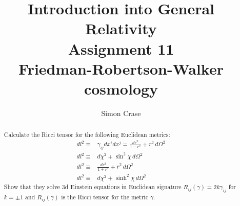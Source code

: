 \documentclass[]{article}
\title{Introduction into General Relativity\\Assignment 11\\Friedman-Robertson-Walker cosmology}
\author{Simon Crase}
\begin{document}
\maketitle

\begin{abstract}
Calculate the Ricci tensor for the following Euclidean metrics:
\begin{align*}
dl^2\equiv&\gamma_{ij}dx^idx^j=\frac{dr^2}{1-r^2}+r^2\,d\Omega^2\\
dl^2\equiv&d\chi^2+\sin^2 \chi\,d\Omega^2\\
dl^2\equiv&\frac{dr^2}{1+r^2}+r^2\,d\Omega^2\\
dl^2\equiv&d\chi^2+\sinh^2 \chi\,d\Omega^2
\end{align*}
Show that they solve 3d Einstein equations in Euclidean signature $R_{ij}(\gamma)=2k\gamma_{ij}$ for $k=\pm 1$ and $R_{ij}(\gamma)$ is the Ricci tensor for the metric $\gamma$.
\end{abstract}

\tableofcontents
\end{document}
